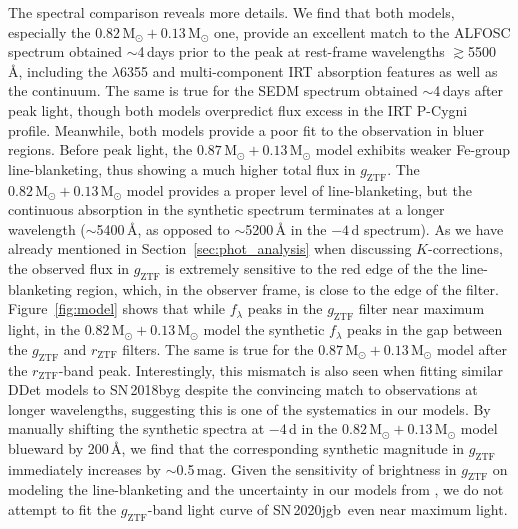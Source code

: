 \documentclass[twocolumn]{aastex631}
\newcommand{\sn}{SN\,2020jgb}
\newcommand{\Msun}{\mathrm{M_\odot}}
\begin{document}
The spectral comparison reveals more details. We find that both models, especially the $0.82\,\Msun+0.13\,\Msun$ one, provide an excellent match to the ALFOSC spectrum obtained $\sim$4\,days prior to the peak at rest-frame wavelengths $\gtrsim$5500\,\r{A}, including the  $\lambda$6355 and multi-component  IRT absorption features as well as the continuum. The same is true for the SEDM spectrum obtained $\sim$4\,days after peak light, though both models overpredict flux excess in the  IRT P-Cygni profile. Meanwhile, both models provide a poor fit to the observation in bluer regions. Before peak light, the $0.87\,\Msun+0.13\,\Msun$ model exhibits weaker Fe-group line-blanketing, thus showing a much higher total flux in $g_\mathrm{ZTF}$. The $0.82\,\Msun+0.13\,\Msun$ model provides a proper level of line-blanketing, but the continuous absorption in the synthetic spectrum terminates at a longer wavelength ($\sim$5400\,\r{A}, as opposed to $\sim$5200\,\r{A} in the $-4$\,d spectrum). As we have already mentioned in Section~\ref{sec:phot_analysis} when discussing $K$-corrections, the observed flux in $g_\mathrm{ZTF}$ is extremely sensitive to the red edge of the the line-blanketing region, which, in the observer frame, is close to the edge of the filter. Figure~\ref{fig:model} shows that while $f_\lambda$ peaks in the $g_\mathrm{ZTF}$ filter near maximum light, in the $0.82\,\Msun+0.13\,\Msun$ model the synthetic $f_\lambda$ peaks in the gap between the $g_\mathrm{ZTF}$ and $r_\mathrm{ZTF}$ filters. The same is true for the $0.87\,\Msun+0.13\,\Msun$ model after the $r_\mathrm{ZTF}$-band peak. Interestingly, this mismatch is also seen when fitting similar DDet models to SN\,2018byg \citep[see Figure~6 in][]{de_18byg_2019} despite the convincing match to observations at longer wavelengths, suggesting this is one of the systematics in our models. By manually shifting the synthetic spectra at $-$4\,d in the $0.82\,\Msun+0.13\,\Msun$ model blueward by 200\,\r{A}, we find that the corresponding synthetic magnitude in $g_\mathrm{ZTF}$ immediately increases by $\sim$0.5\,mag. Given the sensitivity of brightness in $g_\mathrm{ZTF}$ on modeling the line-blanketing and the uncertainty in our models from \citet{polin_observational_2019}, we do not attempt to fit the $g_\mathrm{ZTF}$-band light curve of \sn\ even near maximum light.
\end{document}
